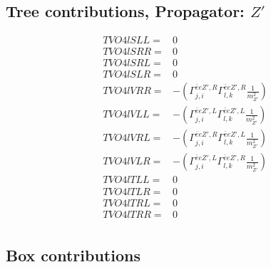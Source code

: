 \documentclass[A4,landscape]{article}
\begin{document}
\subsection{Tree contributions, Propagator: ${Z'}$} 

\begin{align} 
  TVO4lSLL= & 0 \\ 
  TVO4lSRR= & 0 \\ 
  TVO4lSRL= & 0 \\ 
  TVO4lSLR= & 0 \\ 
  TVO4lVRR= & -(\Gamma^{\bar{e}e {Z'} ,R}_{j, i} \Gamma^{\bar{e}e {Z'} ,R}_{l, k} \frac{1}{m^2_{{Z'}}}) \\ 
  TVO4lVLL= & -(\Gamma^{\bar{e}e {Z'} ,L}_{j, i} \Gamma^{\bar{e}e {Z'} ,L}_{l, k} \frac{1}{m^2_{{Z'}}}) \\ 
  TVO4lVRL= & -(\Gamma^{\bar{e}e {Z'} ,R}_{j, i} \Gamma^{\bar{e}e {Z'} ,L}_{l, k} \frac{1}{m^2_{{Z'}}}) \\ 
  TVO4lVLR= & -(\Gamma^{\bar{e}e {Z'} ,L}_{j, i} \Gamma^{\bar{e}e {Z'} ,R}_{l, k} \frac{1}{m^2_{{Z'}}}) \\ 
  TVO4lTLL= & 0 \\ 
  TVO4lTLR= & 0 \\ 
  TVO4lTRL= & 0 \\ 
  TVO4lTRR= & 0 \\ 
\end{align} 
\subsection{Box contributions} 
\end{document}

